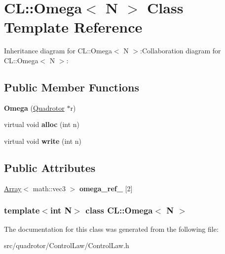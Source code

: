 \hypertarget{classCL_1_1Omega}{
\section{CL::Omega$<$ N $>$ Class Template Reference}
\label{classCL_1_1Omega}
}
Inheritance diagram for CL::Omega$<$ N $>$:Collaboration diagram for CL::Omega$<$ N $>$:\subsection*{Public Member Functions}
\begin{DoxyCompactItemize}
\item 
\hypertarget{classCL_1_1Omega_afcbb238467282d3addd88508937fe37c}{
{\bfseries Omega} (\hyperlink{classQuadrotor}{Quadrotor} $\ast$r)}
\label{classCL_1_1Omega_afcbb238467282d3addd88508937fe37c}

\item 
\hypertarget{classCL_1_1Omega_a68c53ed2e6669dec2f66517fcb42f92e}{
virtual void {\bfseries alloc} (int n)}
\label{classCL_1_1Omega_a68c53ed2e6669dec2f66517fcb42f92e}

\item 
\hypertarget{classCL_1_1Omega_ade07f74d9a84305b7be781911a1b0930}{
virtual void {\bfseries write} (int n)}
\label{classCL_1_1Omega_ade07f74d9a84305b7be781911a1b0930}

\end{DoxyCompactItemize}
\subsection*{Public Attributes}
\begin{DoxyCompactItemize}
\item 
\hypertarget{classCL_1_1Omega_afb1f31f1519495a3e0e9d3fe22b09bd0}{
\hyperlink{classArray}{Array}$<$ math::vec3 $>$ {\bfseries omega\_\-ref\_\-} \mbox{[}2\mbox{]}}
\label{classCL_1_1Omega_afb1f31f1519495a3e0e9d3fe22b09bd0}

\end{DoxyCompactItemize}
\subsubsection*{template$<$int N$>$ class CL::Omega$<$ N $>$}



The documentation for this class was generated from the following file:\begin{DoxyCompactItemize}
\item 
src/quadrotor/ControlLaw/ControlLaw.h\end{DoxyCompactItemize}
